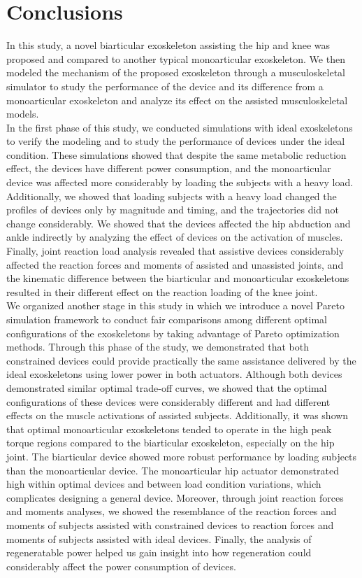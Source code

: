 \documentclass[10pt,letterpaper]{article}
\begin{document}
\section*{Conclusions}
In this study, a novel biarticular exoskeleton assisting the hip and knee was proposed and compared to another typical monoarticular exoskeleton. We then modeled the mechanism of the proposed exoskeleton through a musculoskeletal simulator to study the performance of the device and its difference from a monoarticular exoskeleton and analyze its effect on the assisted musculoskeletal models.\\
In the first phase of this study, we conducted simulations with ideal exoskeletons to verify the modeling and to study the performance of devices under the ideal condition. These simulations showed that despite the same metabolic reduction effect, the devices have different power consumption, and the monoarticular device was affected more considerably by loading the subjects with a heavy load. Additionally, we showed that loading subjects with a heavy load changed the profiles of devices only by magnitude and timing, and the trajectories did not change considerably. We showed that the devices affected the hip abduction and ankle indirectly by analyzing the effect of devices on the activation of muscles. Finally, joint reaction load analysis revealed that assistive devices considerably affected the reaction forces and moments of assisted and unassisted joints, and the kinematic difference between the biarticular and monoarticular exoskeletons resulted in their different effect on the reaction loading of the knee joint.\\
We organized another stage in this study in which we introduce a novel Pareto simulation framework to conduct fair comparisons among different optimal configurations of the exoskeletons by taking advantage of Pareto optimization methods. Through this phase of the study, we demonstrated that both constrained devices could provide practically the same assistance delivered by the ideal exoskeletons using lower power in both actuators. Although both devices demonstrated similar optimal trade-off curves, we showed that the optimal configurations of these devices were considerably different and had different effects on the muscle activations of assisted subjects. Additionally, it was shown that optimal monoarticular exoskeletons tended to operate in the high peak torque regions compared to the biarticular exoskeleton, especially on the hip joint. The biarticular device showed more robust performance by loading subjects than the monoarticular device. The monoarticular hip actuator demonstrated high within optimal devices and between load condition variations, which complicates designing a general device. Moreover, through joint reaction forces and moments analyses, we showed the resemblance of the reaction forces and moments of subjects assisted with constrained devices to reaction forces and moments of subjects assisted with ideal devices. Finally, the analysis of regeneratable power helped us gain insight into how regeneration could considerably affect the power consumption of devices.\\
\end{document}
